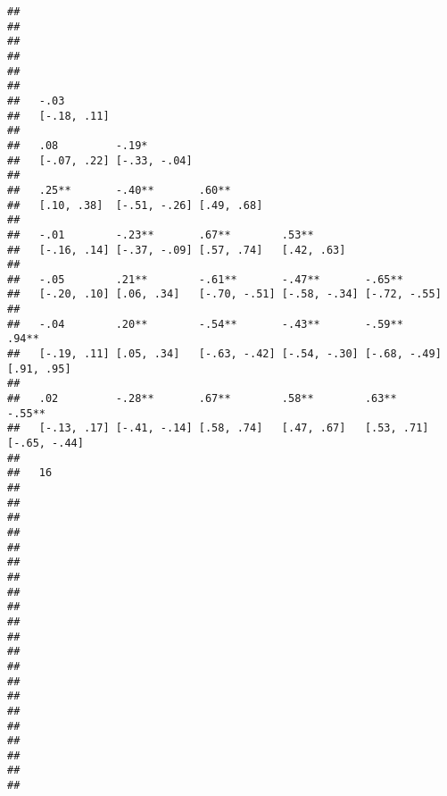 \documentclass[
]{article}
\begin{document}
\begin{verbatim}
##                                                                               
##                                                                               
##                                                                               
##                                                                               
##                                                                               
##                                                                               
##   -.03                                                                        
##   [-.18, .11]                                                                 
##                                                                               
##   .08         -.19*                                                           
##   [-.07, .22] [-.33, -.04]                                                    
##                                                                               
##   .25**       -.40**       .60**                                              
##   [.10, .38]  [-.51, -.26] [.49, .68]                                         
##                                                                               
##   -.01        -.23**       .67**        .53**                                 
##   [-.16, .14] [-.37, -.09] [.57, .74]   [.42, .63]                            
##                                                                               
##   -.05        .21**        -.61**       -.47**       -.65**                   
##   [-.20, .10] [.06, .34]   [-.70, -.51] [-.58, -.34] [-.72, -.55]             
##                                                                               
##   -.04        .20**        -.54**       -.43**       -.59**       .94**       
##   [-.19, .11] [.05, .34]   [-.63, -.42] [-.54, -.30] [-.68, -.49] [.91, .95]  
##                                                                               
##   .02         -.28**       .67**        .58**        .63**        -.55**      
##   [-.13, .17] [-.41, -.14] [.58, .74]   [.47, .67]   [.53, .71]   [-.65, -.44]
##                                                                               
##   16          
##               
##               
##               
##               
##               
##               
##               
##               
##               
##               
##               
##               
##               
##               
##               
##               
##               
##               
##               
##               
##               

\end{verbatim}
\end{document}
